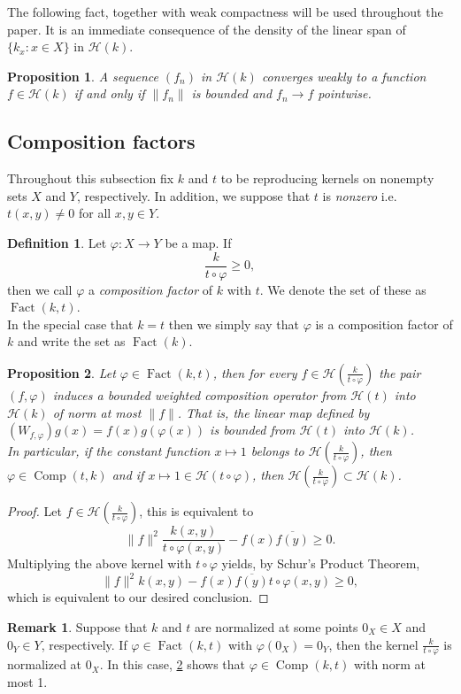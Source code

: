 \documentclass[leqno, final]{article}
\newtheorem{proposition}{Proposition}
\theoremstyle{definition}
\newtheorem{definition}{Definition}
\newtheorem{remark}{Remark}
\newcommand{\Hilbert}{\mathcal{H}}
\renewcommand{\phi}{\varphi}
\DeclareMathOperator{\Fact}{Fact}
\DeclareMathOperator{\Comp}{Comp}
\begin{document}
The following fact, together with weak compactness will be used throughout the paper.
It is an immediate consequence of the density of the linear span of $\{k_x:x\in X\}$ in
$\Hilbert(k)$.
\begin{proposition}
A sequence $(f_n)$ in $\Hilbert(k)$ converges weakly to a function $f\in\Hilbert(k)$
if and only if $\|f_n\|$ is bounded and $f_n\to f$ pointwise.
\end{proposition}

\subsection{Composition factors}
Throughout this subsection fix $k$ and $t$ to be reproducing kernels on nonempty
sets $X$ and $Y$, respectively. In addition, we suppose that $t$ is \emph{nonzero}
i.e. $t(x,y)\neq0$ for all $x,y\in Y$.
\begin{definition}
Let $\phi:X\to Y$ be a map. If \begin{equation}
	\frac{k}{t\circ\phi} \geq 0,
\end{equation}
then we call $\phi$ a \emph{composition factor} of $k$ with $t$. We denote the
set of these as $\Fact(k, t)$.
\\ In the special case that $k=t$ then we simply say that $\phi$ is a composition
factor of $k$ and write the set as $\Fact(k)$.
\end{definition}

\begin{proposition}\label{proposition:weighted-composition}
Let $\phi\in\Fact(k,t)$, then for every $f\in\Hilbert(\frac{k}{t\circ\phi})$ the
pair $(f,\phi)$ induces a bounded weighted composition operator from $\Hilbert(t)$
into $\Hilbert(k)$ of norm at most $\|f\|$. That is, the linear map defined by
$(W_{f,\phi})g(x) = f(x)g(\phi(x))$ is bounded from $\Hilbert(t)$ into $\Hilbert(k)$.
\\ In particular, if the constant function $x\mapsto1$ belongs to $\Hilbert(\frac{k}{t\circ\phi})$,
then $\phi\in\Comp(t, k)$ and
if $x\mapsto1\in\Hilbert(t\circ\phi)$, then $\Hilbert(\frac{k}{t\circ\phi})\subset\Hilbert(k)$.
\end{proposition}
\begin{proof}
Let $f\in\Hilbert(\frac{k}{t\circ\phi})$, this is equivalent to \[
	\|f\|^2\frac{k(x,y)}{t\circ\phi(x,y)} - f(x)\overline{f(y)} \geq 0.
\]
Multiplying the above kernel with $t\circ\phi$ yields, by Schur's Product Theorem, \[
	\|f\|^2k(x,y) - f(x)\overline{f(y)}t\circ\phi(x,y) \geq 0,
\]
which is equivalent to our desired conclusion.
\end{proof}
\begin{remark}
Suppose that $k$ and $t$ are normalized at some points $0_X\in X$ and $0_Y\in Y$,
respectively. If $\phi\in\Fact(k,t)$ with $\phi(0_X) = 0_Y$, then the kernel
$\frac{k}{t\circ\phi}$ is normalized at $0_X$. In this case,
\cref{proposition:weighted-composition} shows that $\phi\in\Comp(k,t)$ with norm at most 1.
\end{remark}
\end{document}
